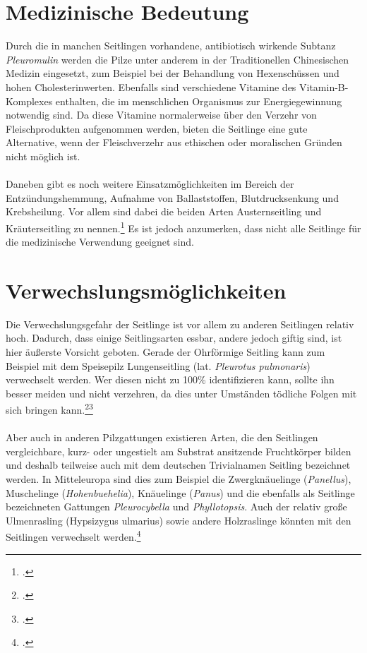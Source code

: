 \documentclass[a4paper,abstracton]{scrreprt}
\begin{document}
\section{Medizinische Bedeutung}
Durch die in manchen Seitlingen vorhandene, antibiotisch wirkende Subtanz \emph{Pleuromulin} werden die Pilze unter anderem in der Traditionellen Chinesischen Medizin eingesetzt, zum Beispiel bei der Behandlung von Hexenschüssen und hohen Cholesterinwerten. Ebenfalls sind verschiedene Vitamine des Vitamin-B-Komplexes enthalten, die im menschlichen Organismus zur Energiegewinnung notwendig sind. Da diese Vitamine normalerweise über den Verzehr von Fleischprodukten aufgenommen werden, bieten die Seitlinge eine gute Alternative, wenn der Fleischverzehr aus ethischen oder moralischen Gründen nicht möglich ist.\\
\\Daneben gibt es noch weitere Einsatzmöglichkeiten im Bereich der Entzündungshemmung, Aufnahme von Ballaststoffen, Blutdrucksenkung und Krebsheilung.
Vor allem sind dabei die beiden Arten Austernseitling und Kräuterseitling zu nennen.\footcite{vital} Es ist jedoch anzumerken, dass nicht alle Seitlinge für die medizinische Verwendung geeignet sind.

\section{Verwechslungsmöglichkeiten}
Die Verwechslungsgefahr der Seitlinge ist vor allem zu anderen Seitlingen relativ hoch. Dadurch, dass einige Seitlingsarten essbar, andere jedoch giftig sind, ist hier äußerste Vorsicht geboten. Gerade der Ohrförmige Seitling kann zum Beispiel mit dem Speisepilz Lungenseitling (lat. \emph{Pleurotus pulmonaris}) verwechselt werden. Wer diesen nicht zu 100\% identifizieren kann, sollte ihn besser meiden und nicht verzehren, da dies unter Umständen tödliche Folgen mit sich bringen kann.\footcite{pg_ohrfoermig}\footcite{deutschlandradio}\\
\\Aber auch in anderen Pilzgattungen existieren Arten, die den Seitlingen vergleichbare, kurz- oder ungestielt am Substrat ansitzende Fruchtkörper bilden und deshalb teilweise auch mit dem deutschen Trivialnamen Seitling bezeichnet werden. In Mitteleuropa sind dies zum Beispiel die Zwergknäuelinge (\emph{Panellus}), Muschelinge (\emph{Hohenbuehelia}), Knäuelinge (\emph{Panus}) und die ebenfalls als Seitlinge bezeichneten Gattungen \emph{Pleurocybella} und \emph{Phyllotopsis}. Auch der relativ große Ulmenrasling (Hypsizygus ulmarius) sowie andere Holzraslinge könnten mit den Seitlingen verwechselt werden.\footcite{faktenuber}
\end{document}

